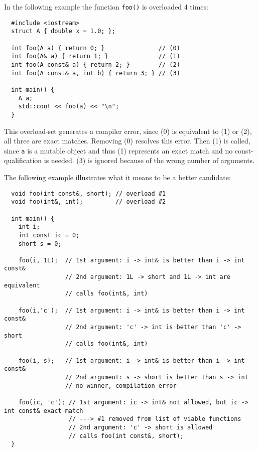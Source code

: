 \begin{example}
  In the following example the function \texttt{foo()} is overloaded 4 times:
  \begin{verbatim}
  #include <iostream>
  struct A { double x = 1.0; };

  int foo(A a) { return 0; }               // (0)
  int foo(A& a) { return 1; }              // (1)
  int foo(A const& a) { return 2; }        // (2)
  int foo(A const& a, int b) { return 3; } // (3)

  int main() {
    A a;
    std::cout << foo(a) << "\n";
  }
  \end{verbatim}
  This overload-set generates a compiler error, since (0) is equivalent to (1) or (2), \ie all three are exact matches. Removing (0) resolves this error.
  Then (1) is called, since \texttt{a} is a mutable object and thus (1) represents an exact match and no const-qualification is needed.
  (3) is ignored because of the wrong number of arguments.
\end{example}

\begin{example}
  The following example illustrates what it means to be a better candidate:
  \begin{verbatim}
  void foo(int const&, short); // overload #1
  void foo(int&, int);         // overload #2

  int main() {
    int i;
    int const ic = 0;
    short s = 0;

    foo(i, 1L);  // 1st argument: i -> int& is better than i -> int const&
                 // 2nd argument: 1L -> short and 1L -> int are equivalent
                 // calls foo(int&, int)

    foo(i,'c');  // 1st argument: i -> int& is better than i -> int const&
                 // 2nd argument: 'c' -> int is better than 'c' -> short
                 // calls foo(int&, int)

    foo(i, s);   // 1st argument: i -> int& is better than i -> int const&
                 // 2nd argument: s -> short is better than s -> int
                 // no winner, compilation error

    foo(ic, 'c'); // 1st argument: ic -> int& not allowed, but ic -> int const& exact match
                  // ---> #1 removed from list of viable functions
                  // 2nd argument: 'c' -> short is allowed
                  // calls foo(int const&, short);
  }
  \end{verbatim}
\end{example}

